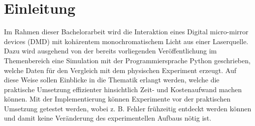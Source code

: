 \section{Einleitung}

Im Rahmen dieser Bachelorarbeit wird die Interaktion eines Digital micro-mirror devices (DMD) mit kohärentem monochromatischem Licht aus einer Laserquelle. Dazu wird ausgehend von der bereits vorliegenden Veröffentlichung \cite{Lachetta2020.10.02.323527} im Themenbereich eine Simulation mit der Programmiersprache Python geschrieben, welche Daten für den Vergleich mit dem physischen Experiment erzeugt. Auf diese Weise sollen Einblicke in die Thematik erlangt werden, welche die praktische Umsetzung effizienter hinsichtlich Zeit- und Kostenaufwand machen können. Mit der Implementierung können Experimente vor der praktischen Umsetzung getestet werden, wobei z. B. Fehler frühzeitig entdeckt werden können und damit keine Veränderung des experimentellen Aufbaus nötig ist. 
